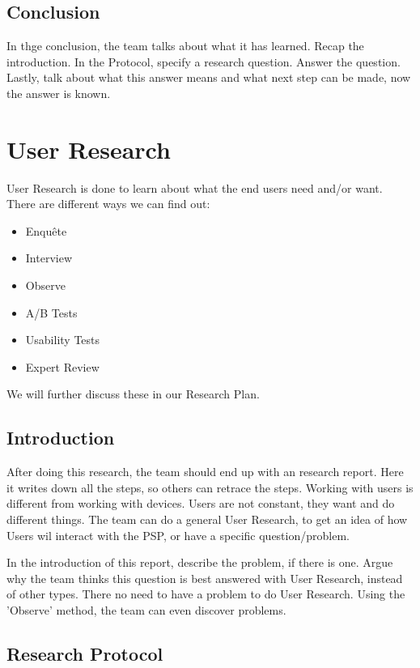 \documentclass[10pt]{report}
\begin{document}
\subsection{Conclusion}

In thge conclusion, the team talks about what it has learned. Recap the introduction. In the Protocol, specify a research question. Answer the question. Lastly, talk about what this answer means and what next step can be made, now the answer is known.

\newpage

\section{User Research}

User Research is done to learn about what the end users need and/or want. There are different ways we can find out:

\begin{itemize}
	\item Enquête
	\item Interview
	\item Observe
	\item A/B Tests
	\item Usability Tests
	\item Expert Review
\end{itemize}

\noindent We will further discuss these in our Research Plan.

\subsection{Introduction}

After doing this research, the team should end up with an research report. Here it writes down all the steps, so others can retrace the steps. Working with users is different from working with devices. Users are not constant, they want and do different things. The team can do a general User Research, to get an idea of how Users wil interact with the PSP, or have a specific question/problem.

In the introduction of this report, describe the problem, if there is one. Argue why the team thinks this question is best answered with User Research, instead of other types. There no need to have a problem to do User Research. Using the 'Observe' method, the team can even discover problems.

\subsection{Research Protocol}
\end{document}
